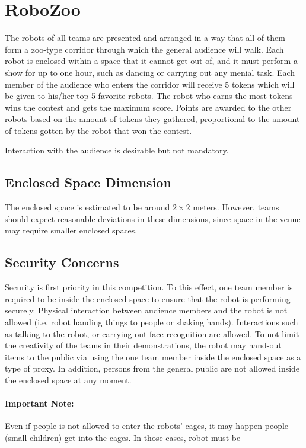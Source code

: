 \section{RoboZoo}
The robots of all teams are presented and arranged in a way that all of them form a zoo-type corridor through which the general audience will walk. Each robot is enclosed within a space that it cannot get out of, and it must perform a show for up to one hour, such as dancing or carrying out any menial task. Each member of the audience who enters the corridor will receive 5 tokens which will be given to his/her top 5 favorite robots. The robot who earns the most tokens wins the contest and gets the maximum score. Points are awarded to the other robots based on the amount of tokens they gathered, proportional to the amount of tokens gotten by the robot that won the contest.

Interaction with the audience is desirable but not mandatory.

\subsection{Enclosed Space Dimension}
The enclosed space is estimated to be around $2 \times 2$ meters. However, teams should expect reasonable deviations in these dimensions, since space in the venue may require smaller enclosed spaces.

\subsection{Security Concerns}
Security is first priority in this competition. To this effect, one team member is required to be inside the enclosed space to ensure that the robot is performing securely. Physical interaction between audience members and the robot is not allowed (i.e. robot handing things to people or shaking hands). Interactions such as talking to the robot, or carrying out face recognition are allowed. To not limit the creativity of the teams in their demonstrations, the robot may hand-out items to the public via using the one team member inside the enclosed space as a type of proxy. In addition, persons from the general public are not allowed inside the enclosed space at any moment.

\paragraph*{Important Note:} Even if people is not allowed to enter the robots' cages, it may happen people (small children) get into the cages. In those cases, robot must be 

